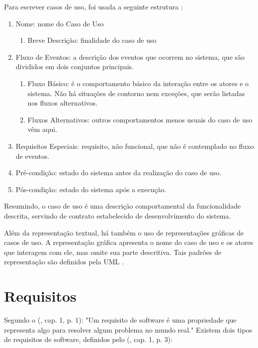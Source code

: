 Para escrever casos de uso, foi usada a seguinte estrutura \cite{ibm2011}:

\begin{enumerate}
    \item Nome: nome do Caso de Uso
    \begin{enumerate}
        \item Breve Descrição: finalidade do caso de uso
    \end{enumerate}
    \item Fluxo de Eventos: a descrição dos eventos que ocorrem no sistema, que são divididos em dois conjuntos principais.
    \begin{enumerate}
        \item Fluxo Básico: é o comportamento básico da interação entre os atores e o sistema. Não há situações de contorno nem exceções, que serão listadas nos fluxos alternativos.
        \item Fluxos Alternativos: outros comportamentos menos usuais do caso de uso vêm aqui.
    \end{enumerate}
    \item Requisitos Especiais: requisito, não funcional, que não é contemplado no fluxo de eventos.
    \item Pré-condição: estado do sistema antes da realização do caso de uso.
    \item Pós-condição: estado do sistema após a execução.
\end{enumerate}

Resumindo, o caso de uso é uma descrição comportamental da funcionalidade descrita, servindo de contrato estabelecido de desenvolvimento do sistema.

Além da representação textual, há também o uso de representações gráficas de casos de uso. A representação gráfica apresenta o nome do caso de uso e os atores que interagem com ele, mas omite sua parte descritiva. Tais padrões de representação são definidos pela UML \cite{uml2017}.

\section{Requisitos}
Segundo o \citeauthor{ieeecomputersociety2014} (\citeyear{ieeecomputersociety2014}, cap. 1, p. 1): "Um requisito de software é uma propriedade que representa algo para resolver algum problema no mundo real." Existem dois tipos de requisitos de software, definidos pelo \citeauthor{ieeecomputersociety2014} (\citeyear{ieeecomputersociety2014}, cap. 1, p. 3):

